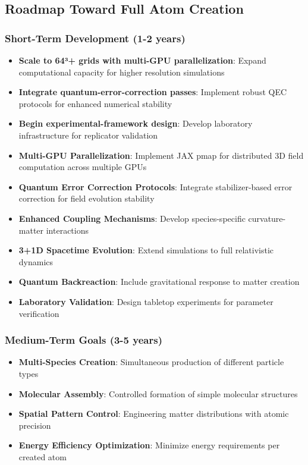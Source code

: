 \documentclass[11pt]{article}
\begin{document}
\subsection*{Roadmap Toward Full Atom Creation}

\subsubsection*{Short-Term Development (1-2 years)}
\begin{itemize}
\item \textbf{Scale to 64³+ grids with multi-GPU parallelization}: Expand computational capacity for higher resolution simulations
\item \textbf{Integrate quantum-error-correction passes}: Implement robust QEC protocols for enhanced numerical stability
\item \textbf{Begin experimental-framework design}: Develop laboratory infrastructure for replicator validation
\item \textbf{Multi-GPU Parallelization}: Implement JAX pmap for distributed 3D field computation across multiple GPUs
\item \textbf{Quantum Error Correction Protocols}: Integrate stabilizer-based error correction for field evolution stability
\item \textbf{Enhanced Coupling Mechanisms}: Develop species-specific curvature-matter interactions
\item \textbf{3+1D Spacetime Evolution}: Extend simulations to full relativistic dynamics
\item \textbf{Quantum Backreaction}: Include gravitational response to matter creation
\item \textbf{Laboratory Validation}: Design tabletop experiments for parameter verification
\end{itemize}

\subsubsection*{Medium-Term Goals (3-5 years)}
\begin{itemize}
\item \textbf{Multi-Species Creation}: Simultaneous production of different particle types
\item \textbf{Molecular Assembly}: Controlled formation of simple molecular structures
\item \textbf{Spatial Pattern Control}: Engineering matter distributions with atomic precision
\item \textbf{Energy Efficiency Optimization}: Minimize energy requirements per created atom
\end{itemize}
\end{document}
